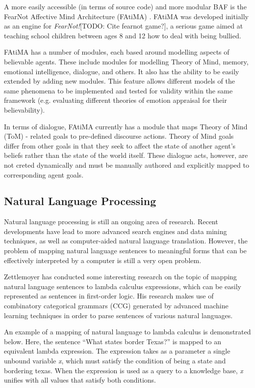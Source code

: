\documentclass{article}
\begin{document}
A more easily accessible (in terms of source code) and more modular
BAF is the FearNot Affective Mind Architecture (FAtiMA)
\cite{Mascarenhas}.  FAtiMA was developed initially as an engine for
\emph{FearNot!}[TODO: Cite fearnot game?], a serious game aimed at
teaching school children between ages 8 and 12 how to deal with being
bullied.

FAtiMA has a number of modules, each based around modelling aspects of
believable agents.  These include modules for modelling Theory of
Mind\cite{Marsella}, memory, emotional intelligence, dialogue, and
others.  It also has the ability to be easily extended by adding new
modules.  This feature allows different models of the same phenomena
to be implemented and tested for validity within the same framework
(e.g. evaluating different theories of emotion appraisal for their
believability).

In terms of dialogue, FAtiMA currently has a module that maps Theory
of Mind (ToM) - related goals to pre-defined discourse actions.  Theory of
Mind goals differ from other goals in that they seek to affect the
state of another agent's beliefs rather than the state of the world
itself.  These dialogue acts, however, are not creted dynamically and
must be manually authored and explicitly mapped to corresponding agent
goals.


\subsection{Natural Language Processing}

Natural language processing is still an ongoing area of research.  Recent
developments have lead to more advanced search engines and data mining 
techniques, as well as computer-aided natural language translation.  However,
the problem of mapping natural language sentences to meaningful forms that can
be effectively interpreted by a computer is still a very open problem.

Zettlemoyer \cite{Zettlemoyer2004} has conducted some interesting research
on the topic of mapping natural language sentences to lambda calculus
expressions, which can be easily represented as sentences in
first-order logic.  His research makes use of combinatory categorical
grammars (CCG) \cite{Steedman2003} generated by advanced machine
learning techniques in order to parse sentences of various natural
languages.

An example of a mapping of natural language to lambda calculus is
demonstrated below.  Here, the sentence ``What states border Texas?''
is mapped to an equivalent lambda expression.  The expression takes as
a parameter a single unbound variable \emph{x}, which must satisfy the
condition of being a state and bordering texas.  When the expression
is used as a query to a knowledge base, \emph{x} unifies with all
values that satisfy both conditions.
\end{document}
